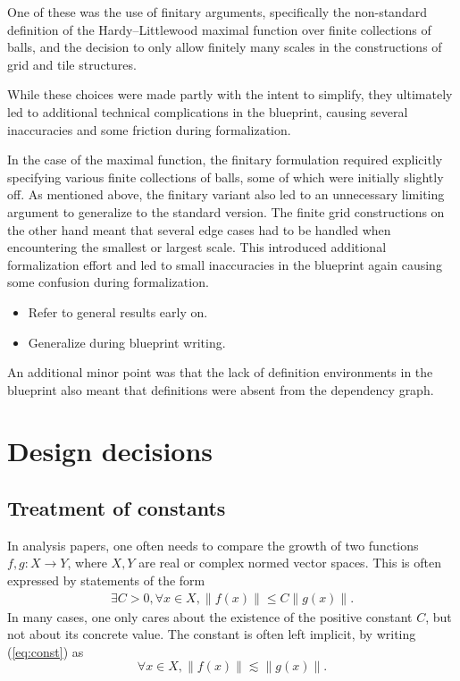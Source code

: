 \documentclass[12pt]{amsart}
\theoremstyle{definition}
\theoremstyle{plain}
\begin{document}
One of these was the use of finitary arguments, specifically the non-standard
definition of the Hardy--Littlewood maximal function over finite collections of balls,
and the decision to only allow finitely many scales in the constructions of grid
and tile structures.

While these choices were made partly with the intent to simplify, they ultimately
led to additional technical complications in the blueprint, causing several inaccuracies
and some friction during formalization.

In the case of the maximal function, the finitary formulation required explicitly specifying
various finite collections of balls, some of which were initially slightly off. As mentioned
above, the finitary variant also led to an unnecessary limiting argument to generalize
to the standard version.
The finite grid constructions on the other hand meant that several edge cases had to be handled
when encountering the smallest or largest scale. This introduced additional formalization effort
and led to small inaccuracies in the blueprint again causing some confusion during formalization.
\begin{itemize}
	\item Refer to general results early on.
	\item Generalize during blueprint writing.
\end{itemize}

An additional minor point was that the lack of definition environments in the blueprint also
meant that definitions were absent from the dependency graph.

\section{Design decisions}\label{sec:design}
\subsection{Treatment of constants}\label{subsec:constants}
In analysis papers, one often needs to compare the growth of two functions $f, g : X \to Y$, where $X, Y$ are real or complex normed vector spaces. This is often expressed by statements of the form
\begin{align}\label{eq:const}
	\exists C > 0, \forall x \in X, \| f (x) \| \le C\|g(x)\|.
\end{align}
In many cases, one only cares about the existence of the positive constant $C$, but not about its concrete value.
The constant is often left implicit, by writing (\ref{eq:const}) as
\[ \forall x \in X, \| f (x) \| \lesssim \|g(x)\|.\]
\end{document}
